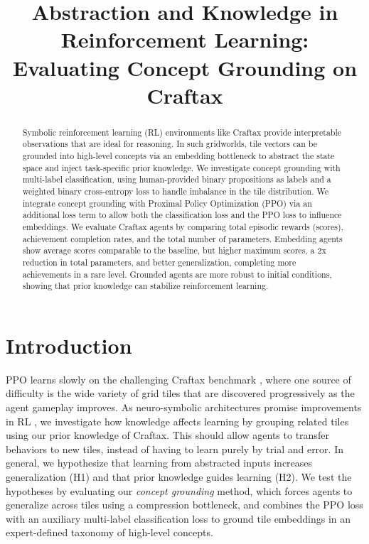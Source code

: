 \documentclass[final]{nesy2026}
\title[Evaluating Concept Grounding on Craftax]{Abstraction and Knowledge in Reinforcement Learning: Evaluating Concept Grounding on Craftax}
\begin{document}
\maketitle

\begin{abstract}
Symbolic reinforcement learning (RL) environments like Craftax provide interpretable observations that are ideal for reasoning.
In such gridworlds, tile vectors can be grounded into high-level concepts via an embedding bottleneck to abstract the state space and inject task-specific prior knowledge.
We investigate concept grounding with multi-label classification, using human-provided binary propositions as labels and a weighted binary cross-entropy loss to handle imbalance in the tile distribution.
We integrate concept grounding with Proximal Policy Optimization (PPO) via an additional loss term to allow both the classification loss and the PPO loss to influence embeddings.
We evaluate Craftax agents by comparing total episodic rewards (scores), achievement completion rates, and the total number of parameters. Embedding agents show average scores comparable to the baseline, but higher maximum scores, a 2x reduction in total parameters, and better generalization, completing more achievements in a rare level.
Grounded agents are more robust to initial conditions, showing that prior knowledge can stabilize reinforcement learning.
\end{abstract}

\section{Introduction}
\label{sec:intro}

PPO \citep{schulman2017} learns slowly on the challenging Craftax benchmark \citep{matthews2024}, where one source of difficulty is the wide variety of grid tiles that are discovered progressively as the agent gameplay improves.
As neuro-symbolic architectures promise improvements in RL \citep{acharya2024}, we investigate how knowledge affects learning by grouping related tiles using our prior knowledge of Craftax.
This should allow agents to transfer behaviors to new tiles, instead of having to learn purely by trial and error.
In general, we hypothesize that learning from abstracted inputs increases generalization (H1) and that prior knowledge guides learning (H2).
We test the hypotheses by evaluating our \emph{concept grounding} method, which forces agents to generalize across tiles using a compression bottleneck, and combines the PPO loss with an auxiliary multi-label classification loss to ground tile embeddings in an expert-defined taxonomy of high-level concepts.
\end{document}
